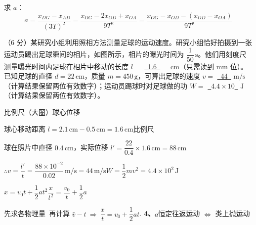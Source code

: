 求 $a$：
\[ a=\frac{x_{DG}-x_{AD}}{(3T)^2}=\frac{x_{OG}-2x_{OD}+x_{OA}}{9T^2}=\frac{x_{OG}-x_{OD}-(x_{OD}-x_{OA})}{9T^2} \]
\begin{problem}
（6 分）某研究小组利用照相方法测量足球的运动速度。研究小组恰好拍摄到一张运动员踢出足球瞬间的相片，如图所示，相片的曝光时间为 $\dfrac{1}{50}\,\mathrm{s}$。他们用刻度尺测量曝光时间内足球在相片中移动的长度 $l=$ \underline{\ 1.6\ }\ \ \ $\mathrm{cm}$（只需读到 mm 位）。已知足球的直径 $d=22\,\mathrm{cm}$，质量 $m=450\,\mathrm{g}$，可算出足球的速度 $v=$ \underline{\ 44\ } $\mathrm{m/s}$（计算结果保留两位有效数字）；运动员踢球时对足球做的功 $W=$ \underline{\ $4.4\times10$\ } $\mathrm{J}$（计算结果保留两位有效数字）。


\begin{solution}
比例尺（大圈）\quad 球心位移

球心移动距离 $l=2.1\,\mathrm{cm}-0.5\,\mathrm{cm}=1.6\,\mathrm{cm}$\qquad 比例尺

球在照片中直径 $0.4\,\mathrm{cm}$，实际位移 $l'=\dfrac{22}{0.4}\times1.6\,\mathrm{cm}=88\,\mathrm{cm}$

$\therefore v=\dfrac{l'}{t}=\dfrac{88\times10^{-2}}{0.02}\,\mathrm{m/s}=44\,\mathrm{m/s}$\qquad $W=\dfrac12mv^2=4.4\times10^2\,\mathrm{J}$
\end{solution}
\end{problem}
$x=v_0t+\dfrac12at^2$\qquad $\dfrac{x}{t^2}=\dfrac{v_0}{t}+\dfrac12a$

先求各物理量\ 再计算
$\bar v-t\ \Rightarrow\ \dfrac{x}{t}=v_0+\dfrac{1}{2}at$.
\textbf{4、}$a$恒定往返运动 $\Leftrightarrow$ 类上抛运动

